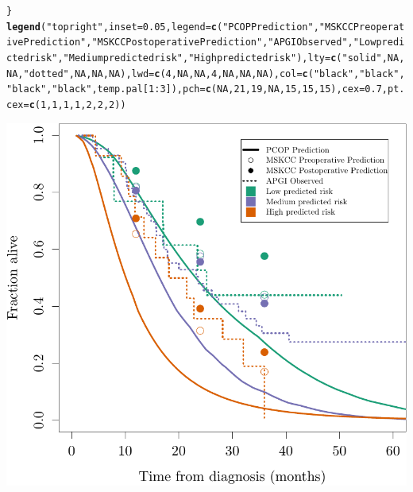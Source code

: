 \documentclass{article}\usepackage[]{graphicx}\usepackage[]{color}
\makeatletter
\def\maxwidth{ %
  \ifdim\Gin@nat@width>\linewidth
    \linewidth
  \else
    \Gin@nat@width
  \fi
}
\newcommand{\hlnum}[1]{\textcolor[rgb]{0.686,0.059,0.569}{#1}}%
\newcommand{\hlstr}[1]{\textcolor[rgb]{0.192,0.494,0.8}{#1}}%
\newcommand{\hlopt}[1]{\textcolor[rgb]{0,0,0}{#1}}%
\newcommand{\hlstd}[1]{\textcolor[rgb]{0.345,0.345,0.345}{#1}}%
\newcommand{\hlkwc}[1]{\textcolor[rgb]{0.333,0.667,0.333}{#1}}%
\newcommand{\hlkwd}[1]{\textcolor[rgb]{0.737,0.353,0.396}{\textbf{#1}}}%
\newenvironment{kframe}{%
 \def\at@end@of@kframe{}%
 \ifinner\ifhmode%
  \def\at@end@of@kframe{\end{minipage}}%
  \begin{minipage}{\columnwidth}%
 \fi\fi%
 \def\FrameCommand##1{\hskip\@totalleftmargin \hskip-\fboxsep
 \colorbox{shadecolor}{##1}\hskip-\fboxsep
     \hskip-\linewidth \hskip-\@totalleftmargin \hskip\columnwidth}%
 \MakeFramed {\advance\hsize-\width
   \@totalleftmargin\z@ \linewidth\hsize
   \@setminipage}}%
 {\par\unskip\endMakeFramed%
 \at@end@of@kframe}
\newenvironment{knitrout}{}{} %
\makeatother
\begin{document}
\begin{knitrout}
\begin{kframe}
\begin{alltt}
\hlstd{\}}
\hlkwd{legend}\hlstd{(}\hlstr{"topright"}\hlstd{,} \hlkwc{inset} \hlstd{=} \hlnum{0.05}\hlstd{,} \hlkwc{legend} \hlstd{=} \hlkwd{c}\hlstd{(}\hlstr{"PCOP Prediction"}\hlstd{,} \hlstr{"MSKCC Preoperative Prediction"}\hlstd{,} \hlstr{"MSKCC Postoperative Prediction"}\hlstd{,} \hlstr{"APGI Observed"}\hlstd{,} \hlstr{"Low predicted risk"}\hlstd{,} \hlstr{"Medium predicted risk"}\hlstd{,} \hlstr{"High predicted risk"}\hlstd{),} \hlkwc{lty} \hlstd{=} \hlkwd{c}\hlstd{(}\hlstr{"solid"}\hlstd{,} \hlnum{NA}\hlstd{,} \hlnum{NA}\hlstd{,} \hlstr{"dotted"}\hlstd{,} \hlnum{NA}\hlstd{,} \hlnum{NA}\hlstd{,} \hlnum{NA}\hlstd{),} \hlkwc{lwd} \hlstd{=} \hlkwd{c}\hlstd{(}\hlnum{4}\hlstd{,} \hlnum{NA}\hlstd{,} \hlnum{NA}\hlstd{,} \hlnum{4}\hlstd{,} \hlnum{NA}\hlstd{,} \hlnum{NA}\hlstd{,} \hlnum{NA}\hlstd{),} \hlkwc{col} \hlstd{=} \hlkwd{c}\hlstd{(}\hlstr{"black"}\hlstd{,} \hlstr{"black"}\hlstd{,} \hlstr{"black"}\hlstd{,} \hlstr{"black"}\hlstd{, temp.pal[}\hlnum{1}\hlopt{:}\hlnum{3}\hlstd{]),} \hlkwc{pch} \hlstd{=} \hlkwd{c}\hlstd{(}\hlnum{NA}\hlstd{,} \hlnum{21}\hlstd{,} \hlnum{19}\hlstd{,} \hlnum{NA}\hlstd{,} \hlnum{15}\hlstd{,} \hlnum{15}\hlstd{,} \hlnum{15}\hlstd{),} \hlkwc{cex} \hlstd{=} \hlnum{0.7}\hlstd{,} \hlkwc{pt.cex} \hlstd{=} \hlkwd{c}\hlstd{(}\hlnum{1}\hlstd{,} \hlnum{1}\hlstd{,} \hlnum{1}\hlstd{,} \hlnum{1}\hlstd{,} \hlnum{2}\hlstd{,} \hlnum{2}\hlstd{,} \hlnum{2}\hlstd{))}
\end{alltt}
\end{kframe}

{\centering \includegraphics[width=\maxwidth]{figure/07-altman-4-apgi-1} 

}
\end{knitrout}
\end{document}
